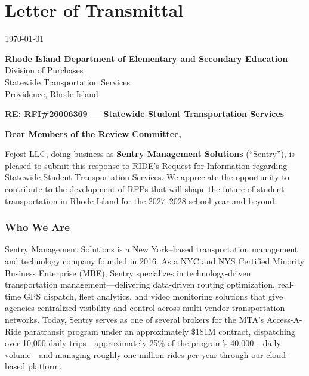 \section{\texorpdfstring{\color{MidnightBlue}Letter of Transmittal}{Letter of Transmittal}}

\begin{flushright}
\today
\end{flushright}

\vspace{0.5cm}

\noindent
\textbf{Rhode Island Department of Elementary and Secondary Education} \\
Division of Purchases \\
Statewide Transportation Services \\
Providence, Rhode Island

\vspace{0.5cm}

\noindent
\textbf{RE: RFI\#26006369 --- Statewide Student Transportation Services}

\vspace{0.5cm}

\noindent
\textbf{Dear Members of the Review Committee,}

\vspace{0.3cm}

Fejost LLC, doing business as \textbf{Sentry Management Solutions} (``Sentry''), is pleased to submit this response to RIDE's Request for Information regarding Statewide Student Transportation Services. We appreciate the opportunity to contribute to the development of RFPs that will shape the future of student transportation in Rhode Island for the 2027--2028 school year and beyond.

\vspace{0.3cm}

\subsubsection*{Who We Are}

Sentry Management Solutions is a New York--based transportation management and technology company founded in 2016. As a NYC and NYS Certified Minority Business Enterprise (MBE), Sentry specializes in technology-driven transportation management---delivering data-driven routing optimization, real-time GPS dispatch, fleet analytics, and video monitoring solutions that give agencies centralized visibility and control across multi-vendor transportation networks. Today, Sentry serves as one of several brokers for the MTA's Access-A-Ride paratransit program under an approximately \$181M contract, dispatching over 10,000 daily trips---approximately 25\% of the program's 40,000+ daily volume---and managing roughly one million rides per year through our cloud-based platform.

